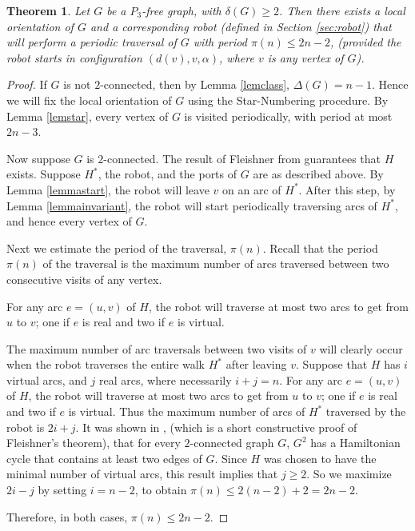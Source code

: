 \documentclass[12pt,letterpaper,oneside]{book}
\newtheorem{theorem}{Theorem}[section]
\begin{document}
\begin{theorem}\label{pmain}
Let $G$ be a $P_3$-free graph, with $\delta(G)\ge 2$.  Then there exists a local orientation of $G$ and a corresponding 
robot (defined in Section \ref{sec:robot}) that 
will perform a periodic traversal of $G$ with period $\pi (n) \le 2n-2$, (provided the robot starts in configuration $(d(v),v,\alpha)$, 
where $v$ is any vertex of $G$).
\end{theorem} 
\begin{proof} 
 
If $G$ is not $2$-connected, then by Lemma \ref{lemclass}, $\Delta(G)=n-1$.  Hence we will fix the local orientation of $G$ using 
the Star-Numbering procedure.  By Lemma \ref{lemstar}, every vertex of $G$ is visited periodically, with period at most $2n-3$.  


Now suppose $G$ is $2$-connected.  
The result of Fleishner from \cite{FL} guarantees that $H$ exists.  Suppose $H^*$, the robot, and the ports of $G$ 
are as described above.  
By Lemma \ref{lemmastart}, the robot will leave $v$ on an arc of $H^*$.  After this step, by 
Lemma \ref{lemmainvariant}, the robot will start periodically traversing arcs of $H^*$, and hence every vertex of $G$.  

Next we estimate 
the period of the traversal, $\pi(n)$.  
Recall that the period $\pi(n)$ of the traversal 
is the maximum number of arcs traversed between two consecutive visits of any vertex.  


For any arc $e=(u,v)$ of $H$, the robot will traverse at most two arcs to get from $u$ to $v$; one if $e$ 
is real and two if $e$ is virtual.  

The maximum number of arc traversals between two visits of $v$ will clearly occur 
when the robot traverses the entire walk $H^*$ after leaving $v$.  Suppose that $H$ has $i$ virtual arcs, and $j$ real arcs, 
where necessarily $i+j=n$.  For any arc $e=(u,v)$ of $H$, the robot will traverse at most two arcs to get from $u$ to $v$; one if $e$ 
is real and two if $e$ is virtual.  
Thus the maximum number of arcs of $H^*$ traversed by the robot is $2i+j$.  
It was shown in \cite{G}, (which is a short constructive proof of Fleishner's theorem), that for every $2$-connected 
graph $G$, $G^2$ has a Hamiltonian cycle that contains at least two edges of $G$.  Since $H$ 
was chosen to have the minimal number of virtual arcs, this result implies that $j\ge 2$.  So we maximize $2i-j$ by setting $i=n-2$, to obtain 
$\pi(n)\le 2(n-2)+2 = 2n-2$.  

Therefore, in both cases, $\pi(n)\le 2n-2$.  
 
\end{proof} 
\end{document}
